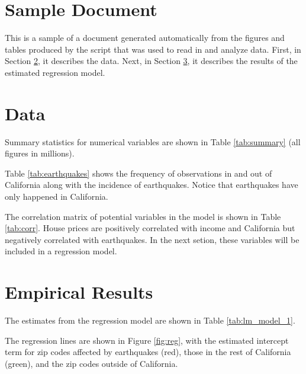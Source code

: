 \documentclass{paper}
\begin{document}

\section{Sample Document}

This is a sample of a document generated automatically from the figures and tables produced by 
the script that was used to read in and analyze data. 
First, in Section \ref{sec:data}, it describes the data. 
Next, in Section \ref{sec:results}, it describes the results of the estimated regression model. 

\section{Data} \label{sec:data}

Summary statistics for numerical variables are shown in Table \ref{tab:summary} (all figures in millions). 




Table \ref{tab:earthquakes} shows the frequency of observations in and out of California along with the incidence of earthquakes. Notice that earthquakes have only happened in California. 



The correlation matrix of potential variables in the model is shown in Table \ref{tab:corr}. 
House prices are positively correlated with income and California but negatively correlated with earthquakes. In the next setion, these variables will be included in a regression model. 





\pagebreak
\section{Empirical Results}  \label{sec:results}


The estimates from the regression model are shown in Table \ref{tab:lm_model_1}. 







\pagebreak
The regression lines are shown in Figure \ref{fig:reg}, with the estimated intercept term for zip codes affected by earthquakes (red), those in the rest of California (green), and the zip codes outside of California. 
\end{document}
